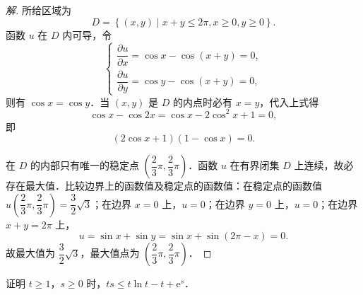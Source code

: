 \begin{proof}[解]
所给区域为
\[
D=\left\{(x,y)\mid x+y\leqslant2\pi,x\geqslant0,y\geqslant0\right\}.
\]
函数 $u$ 在 $D$ 内可导，令
\[
\begin{cases}
\dfrac{\partial u}{\partial x}=\cos x-\cos(x+y)=0,\\[2mm]
\dfrac{\partial u}{\partial y}=\cos y-\cos(x+y)=0,
\end{cases}
\]
则有 $\cos x=\cos y$．当 $(x,y)$ 是 $D$ 的内点时必有 $x=y$，代入上式得
\[
\cos x-\cos 2x=\cos x-2\cos^{2}x+1=0,
\]
即
\[
(2\cos x+1)(1-\cos x)=0.
\]

\begin{figure}[htbp]
\centering
{}\caption{\relax}\label{fig:18-5}
\end{figure}

在 $D$ 的内部只有唯一的稳定点 $\left(\dfrac{2}{3}\pi,\dfrac{2}{3}\pi\right)$．函数 $u$ 在有界闭集 $D$ 上连续，故必存在最大值．比较边界上的函数值及稳定点的函数值：在稳定点的函数值 $u\left(\dfrac{2}{3}\pi,\dfrac{2}{3}\pi\right)=\dfrac{3}{2}\sqrt{3}$；在边界 $x=0$ 上，$u=0$；在边界 $y=0$ 上，$u=0$；在边界 $x+y=2\pi$ 上，
\[
u=\sin x+\sin y=\sin x+\sin(2\pi-x)=0.
\]
故最大值为 $\dfrac{3}{2}\sqrt{3}$，最大值点为 $\left(\dfrac{2}{3}\pi,\dfrac{2}{3}\pi\right)$．
\end{proof}

\begin{example}\label{ex:18-1-3}
证明 $t\geqslant1$，$s\geqslant0$ 时，$ts\leqslant t\ln t-t+\mathrm{e}^{s}$．
\end{example}

